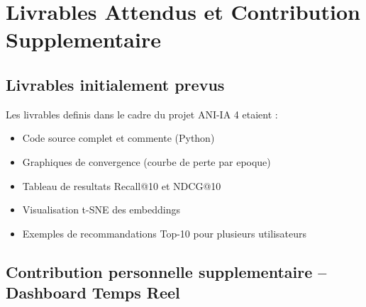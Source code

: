 \documentclass[12pt,a4paper]{report}
\begin{document}
\section{Livrables Attendus et Contribution Supplementaire}

\subsection{Livrables initialement prevus}

Les livrables definis dans le cadre du projet ANI-IA 4 etaient :

\begin{itemize}
  \item Code source complet et commente (Python)
  \item Graphiques de convergence (courbe de perte par epoque)
  \item Tableau de resultats Recall@10 et NDCG@10
  \item Visualisation t-SNE des embeddings
  \item Exemples de recommandations Top-10 pour plusieurs
    utilisateurs
\end{itemize}

\subsection{Contribution personnelle supplementaire -- Dashboard Temps Reel}
\end{document}
